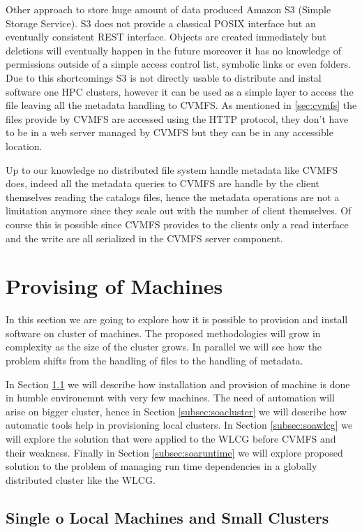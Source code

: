 Other approach to store huge amount of data produced Amazon S3 (Simple Storage
Service). S3 does not provide a classical POSIX interface but an eventually
consistent REST interface. Objects are created immediately but deletions will
eventually happen in the future moreover it has no knowledge of permissions
outside of a simple access control list, symbolic links or even folders. Due to
this shortcomings S3 is not directly usable to distribute and instal software
one HPC clusters, however it can be used as a simple layer to access the file
leaving all the metadata handling to CVMFS. As mentioned in \ref{sec:cvmfs} the
files provide by CVMFS are accessed using the HTTP protocol, they don't have to
be in a web server managed by CVMFS but they can be in any accessible location.

Up to our knowledge no distributed file system handle metadata like CVMFS does,
indeed all the metadata queries to CVMFS are handle by the client themselves
reading the catalogs files, hence the metadata operations are not a limitation
anymore since they scale out with the number of client themselves. Of course
this is possible since CVMFS provides to the clients only a read interface and
the write are all serialized in the CVMFS server component.

\section{Provising of Machines} \label{sec:provisioning}

In this section we are going to explore how it is possible to provision and
install software on cluster of machines. The proposed methodologies will grow
in complexity as the size of the cluster grows. In parallel we will see how the
problem shifts from the handling of files to the handling of metadata.

In Section \ref{subsec:soasmall} we will describe how installation and
provision of machine is done in humble environemnt with very few machines. The
need of automation will arise on bigger cluster, hence in Section
\ref{subsec:soacluster} we will describe how automatic tools help in
provisioning local clusters. In Section \ref{subsec:soawlcg} we will explore
the solution that were applied to the WLCG before CVMFS and their weakness.
Finally in Section \ref{subsec:soaruntime} we will explore proposed solution to
the problem of managing run time dependencies in a globally distributed cluster
like the WLCG.

\subsection{Single o Local Machines and Small Clusters} \label{subsec:soasmall}

